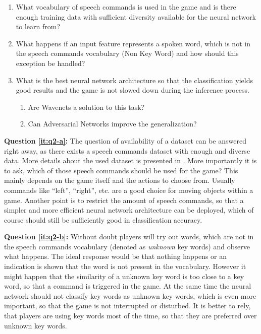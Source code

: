 \begin{enumerate}[label={Q.2.\alph*)}, leftmargin=1.75cm]
  \item What vocabulary of speech commands is used in the game and is there enough training data with sufficient diversity available for the neural network to learn from?\label{it:q2-a}

  \item What happens if an input feature represents a spoken word, which is not in the speech commands vocabulary (Non Key Word) and how should this exception be handled?\label{it:q2-b}

  \item What is the best neural network architecture so that the classification yields good results and the game is not slowed down during the inference process.\label{it:q2-c}
  \begin{enumerate}[label=(\roman*)]
    \item Are Wavenets a solution to this task? 
    \item Can Adversarial Networks improve the generalization?
  \end{enumerate}
\end{enumerate}
\noindent
\textbf{Question \ref{it:q2-a}:} The question of availability of a dataset can be answered right away, as there exists a speech commands dataset \cite{Warden2018} with enough and diverse data.
More details about the used dataset is presented in .
More importantly it is to ask, which of those speech commands should be used for the game?
This mainly depends on the game itself and the actions to choose from.
Usually commands like \enquote{left}, \enquote{right}, etc. are a good choice for moving objects within a game.
Another point is to restrict the amount of speech commands, so that a simpler and more efficient neural network architecture can be deployed, which of course should still be sufficiently good in classification accuracy.

\textbf{Question \ref{it:q2-b}:} Without doubt players will try out words, which are not in the speech commands vocabulary (denoted as \emph{unknown} key words) and observe what happens.
The ideal response would be that nothing happens or an indication is shown that the word is not present in the vocabulary. 
However it might happen that the similarity of a unknown key word is too close to a key word, so that a command is triggered in the game. 
At the same time the neural network should not classify key words as unknown key words, which is even more important, so that the game is not interrupted or disturbed.
It is better to rely, that players are using key words most of the time, so that they are preferred over unknown key words.

